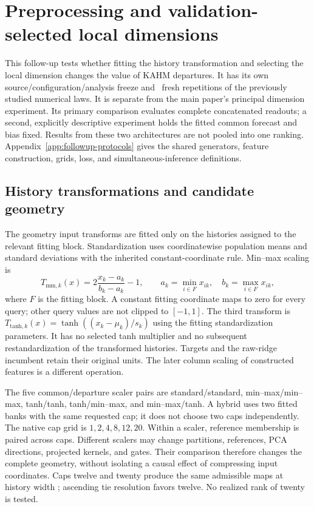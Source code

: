 \section{Preprocessing and validation-selected local dimensions}
\label{sec:preprocessing-dimension-followup}

This follow-up tests whether fitting the history transformation and selecting
the local dimension changes the value of KAHM departures. It has its own
source/configuration/analysis freeze and \PPRepetitions\ fresh repetitions
of the previously studied numerical laws. It is separate from the main
paper's principal dimension experiment. Its primary comparison evaluates
complete concatenated readouts; a second, explicitly descriptive experiment
holds the fitted common forecast and bias fixed. Results from these two
architectures are not pooled into one ranking. Appendix~\ref{app:followup-protocols}
gives the shared generators, feature construction, grids, loss, and
simultaneous-inference definitions.

\subsection{History transformations and candidate geometry}

The geometry input transforms are fitted only on the histories assigned to
the relevant fitting block. Standardization uses coordinatewise population
means and standard deviations with the inherited constant-coordinate rule.
Min--max scaling is
\[
 T_{\mathrm{mm},k}(x)=2\frac{x_k-a_k}{b_k-a_k}-1,
 \qquad a_k=\min_{i\in F}x_{ik},\quad b_k=\max_{i\in F}x_{ik},
\]
where $F$ is the fitting block. A constant fitting coordinate maps to zero
for every query; other query values are not clipped to $[-1,1]$.
The third transform is $T_{\mathrm{tanh},k}(x)=
\tanh((x_k-\mu_k)/s_k)$ using the fitting standardization parameters.
It has no selected tanh multiplier and no subsequent restandardization of
the transformed histories. Targets and the raw-ridge incumbent retain their
original units. The later column scaling of constructed features is a
different operation.

The five common/departure scaler pairs are standard/standard,
min--max/min--max, tanh/tanh, tanh/min--max, and min--max/tanh. A hybrid
uses two fitted banks with the same requested cap; it does not choose two
caps independently. The native cap grid is $1,2,4,8,12,20$. Within a scaler,
reference membership is paired across caps. Different scalers may change
partitions, references, PCA directions, projected kernels, and gates. Their
comparison therefore changes the complete geometry, without isolating a
causal effect of compressing input coordinates. Caps twelve and twenty
produce the same admissible maps at history width \PPHistory; ascending
tie resolution favors twelve. No realized rank of twenty is tested.

